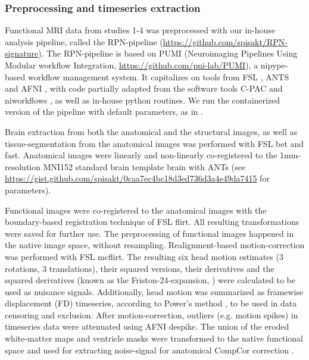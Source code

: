\documentclass{article}
\begin{document}
\subsubsection{Preprocessing and timeseries extraction}

Functional MRI data from studies 1-4 was preprocessed with our in-house analysis pipeline, called the RPN-pipeline (\href{https://github.com/spisakt/RPN-signature}{https://github.com/spisakt/RPN-signature}). The RPN-pipeline is based on PUMI (Neuroimaging Pipelines Using Modular workflow Integration, \href{https://github.com/pni-lab/PUMI}{https://github.com/pni-lab/PUMI}), a nipype-based \citep{gorgolewski2011nipype} workflow management system. It capitalizes on tools from FSL \citep{jenkinson2012fsl}, ANTS \citep{avants2011reproducible} and AFNI \citep{cox1996afni}, with code partially adapted from the software tools C-PAC \citep{craddock2013towards} and niworkflows \citep{esteban2019fmriprep}, as well as in-house python routines. We run the containerized version of the pipeline with default parameters, as in \cite{Spisak_2020}.

Brain extraction from both the anatomical and the structural images, as well as tissue-segmentation from the anatomical images was performed with FSL bet and fast. Anatomical images were linearly and non-linearly co-registered to the 1mm-resolution MNI152 standard brain template brain with ANTs (see \href{https://gist.github.com/spisakt/0caa7ec4bc18d3ed736d3a4e49da7415}{https://gist.github.com/spisakt/0caa7ec4bc18d3ed736d3a4e49da7415} for parameters).

Functional images were co-registered to the anatomical images with the boundary-based registration technique of FSL flirt. All resulting transformations were saved for further use. The preprocessing of functional images happened in the native image space, without resampling. Realignment-based motion-correction was performed with FSL mcflirt. The resulting six head motion estimates (3 rotations, 3 translations), their squared versions, their derivatives and the squared derivatives (known as the Friston-24-expansion, \cite{friston1996movement}) were calculated to be used as nuisance signals. Additionally, head motion was summarized as framewise displacement (FD) timeseries, according to Power's method \citep{power2012spurious}, to be used in data censoring and exclusion. After motion-correction, outliers (e.g. motion spikes) in timeseries data were attenuated using AFNI despike. The union of the eroded white-matter maps and ventricle masks were transformed to the native functional space and used for extracting noise-signal for anatomical CompCor correction \citep{behzadi2007component}.
\end{document}
